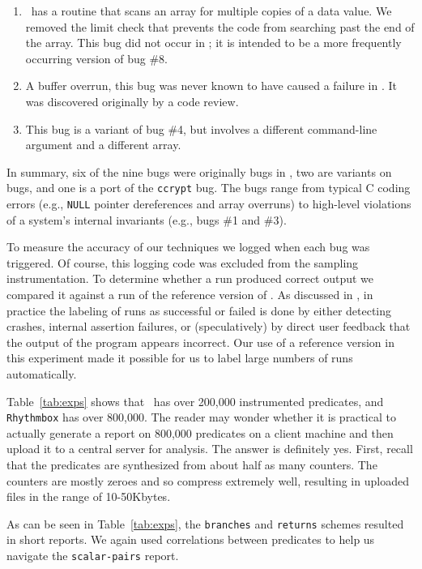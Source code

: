 \begin{enumerate}
\item \moss\ has a routine that scans an array for multiple copies of a data value.
We removed the limit check that prevents the code from searching past the end of the array.  
This bug did not occur in \moss; it is intended to be a more frequently occurring version of bug \#8.

\item  A buffer overrun, this bug was never known to have caused a failure in \moss. It
was discovered originally by a code review.

\item This bug is a variant of bug \#4, but involves a different command-line argument and
a different array.
\end{enumerate}

In summary, six of the nine bugs were originally bugs in \moss, two are variants on \moss bugs, and one
is a port of the {\tt ccrypt} bug.  The bugs
range from typical C coding errors (e.g., \texttt{NULL} pointer dereferences
and array overruns) to high-level violations of a system's internal
invariants (e.g., bugs \#1 and \#3).

To measure the accuracy of our techniques we logged 
when each bug was triggered.  Of course, this logging 
code was excluded from the sampling instrumentation.
To determine whether a run produced correct output we compared it against a run
of the reference version of \moss.  As discussed in ,
in practice the labeling of runs as successful or failed is done by either detecting
crashes, internal assertion failures, or (speculatively) by direct user feedback that the output
of the program appears incorrect.  Our use of a reference version in this experiment made
it possible for us to label large numbers of runs automatically.

Table~\ref{tab:exps} shows that \moss\ has over 200,000 instrumented predicates,
and {\tt Rhythmbox} has over 800,000.
The reader may wonder whether it is practical to actually generate a report on
800,000 predicates on a client machine and then upload it to a central
server for analysis.  The answer is definitely yes.  First, recall
that the predicates are synthesized from about half as many counters.
The counters are mostly zeroes and so compress extremely well,
resulting in uploaded files in the range of 10-50Kbytes.

As can be seen in Table~\ref{tab:exps}, the {\tt branches} and {\tt returns} schemes
resulted in short reports.  We again used correlations between predicates to help us navigate
the {\tt scalar-pairs} report.

